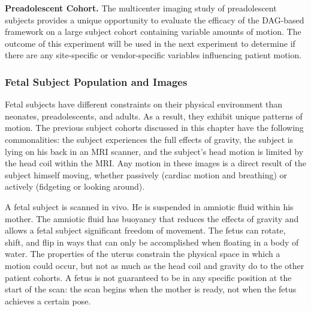 \textbf{Preadolescent Cohort.} The multicenter imaging study of preadolescent subjects provides a unique opportunity to evaluate the efficacy of the DAG-based framework on a large subject cohort containing variable amounts of motion. The outcome of this experiment will be used in the next experiment to determine if there are any site-specific or vendor-specific variables influencing patient motion.


\subsubsection{Fetal Subject Population and Images}


Fetal subjects have different constraints on their physical environment than neonates, preadolescents, and adults. As a result, they exhibit unique patterns of motion. The previous subject cohorts discussed in this chapter have the following commonalities: the subject experiences the full effects of gravity, the subject is lying on his back in an MRI scanner, and the subject's head motion is limited by the head coil within the MRI. Any motion in these images is a direct result of the subject himself moving, whether passively (cardiac motion and breathing) or actively (fidgeting or looking around).

A fetal subject is scanned in vivo. He is suspended in amniotic fluid within his mother. The amniotic fluid has buoyancy that reduces the effects of gravity and allows a fetal subject significant freedom of movement. The fetus can rotate, shift, and flip in ways that can only be accomplished when floating in a body of water. The properties of the uterus constrain the physical space in which a motion could occur, but not as much as the head coil and gravity do to the other patient cohorts. A fetus is not guaranteed to be in any specific position at the start of the scan: the scan begins when the mother is ready, not when the fetus achieves a certain pose. 

